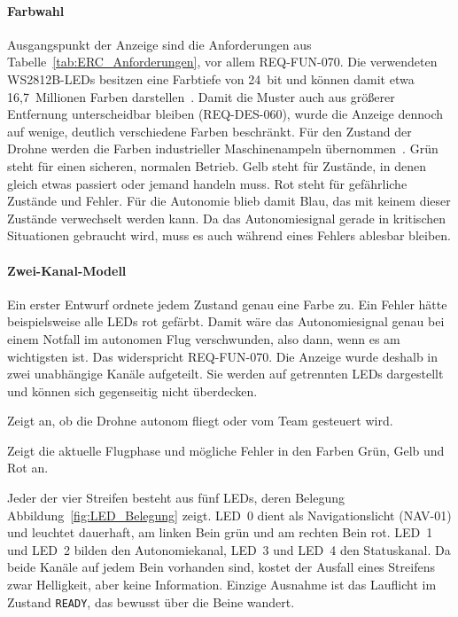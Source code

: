             \paragraph{Farbwahl}
            \label{sec:LED_Anforderungen}
            Ausgangspunkt der Anzeige sind die Anforderungen aus Tabelle~\ref{tab:ERC_Anforderungen}, vor allem REQ-FUN-070. Die verwendeten WS2812B-LEDs besitzen eine Farbtiefe von \SI{24}{bit} und können damit etwa 16,7~Millionen Farben darstellen~\cite{ws2812btds}. Damit die Muster auch aus größerer Entfernung unterscheidbar bleiben (REQ-DES-060), wurde die Anzeige dennoch auf wenige, deutlich verschiedene Farben beschränkt. Für den Zustand der Drohne werden die Farben industrieller Maschinenampeln übernommen~\cite{item24signale}. Grün steht für einen sicheren, normalen Betrieb. Gelb steht für Zustände, in denen gleich etwas passiert oder jemand handeln muss. Rot steht für gefährliche Zustände und Fehler. Für die Autonomie blieb damit Blau, das mit keinem dieser Zustände verwechselt werden kann. Da das Autonomiesignal gerade in kritischen Situationen gebraucht wird, muss es auch während eines Fehlers ablesbar bleiben.

            \paragraph{Zwei-Kanal-Modell}
            \label{sec:LED_ZweiKanal}
            Ein erster Entwurf ordnete jedem Zustand genau eine Farbe zu. Ein Fehler hätte beispielsweise alle LEDs rot gefärbt. Damit wäre das Autonomiesignal genau bei einem Notfall im autonomen Flug verschwunden, also dann, wenn es am wichtigsten ist. Das widerspricht REQ-FUN-070. Die Anzeige wurde deshalb in zwei unabhängige Kanäle aufgeteilt. Sie werden auf getrennten LEDs dargestellt und können sich gegenseitig nicht überdecken.

            \begin{description}[style=nextline]
                \item[Autonomiekanal] Zeigt an, ob die Drohne autonom fliegt oder vom Team gesteuert wird.
                \item[Statuskanal] Zeigt die aktuelle Flugphase und mögliche Fehler in den Farben Grün, Gelb und Rot an.
            \end{description}

            Jeder der vier Streifen besteht aus fünf LEDs, deren Belegung Abbildung~\ref{fig:LED_Belegung} zeigt. LED~0 dient als Navigationslicht (NAV-01) und leuchtet dauerhaft, am linken Bein grün und am rechten Bein rot. LED~1 und LED~2 bilden den Autonomiekanal, LED~3 und LED~4 den Statuskanal. Da beide Kanäle auf jedem Bein vorhanden sind, kostet der Ausfall eines Streifens zwar Helligkeit, aber keine Information. Einzige Ausnahme ist das Lauflicht im Zustand \texttt{READY}, das bewusst über die Beine wandert.

